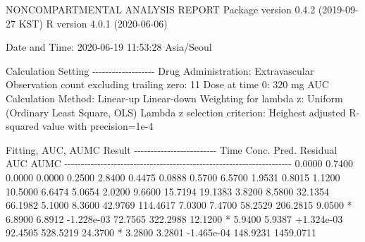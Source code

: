 \documentclass[
  10pt,
]{krantz}
\makeatletter
\newenvironment{Shaded}{\begin{snugshade}}{\end{snugshade}}
\newcommand{\ExtensionTok}[1]{#1}
\newcommand{\NormalTok}[1]{#1}
\newenvironment{kframe}{%
\medskip{}
\setlength{\fboxsep}{.8em}
 \def\at@end@of@kframe{}%
 \ifinner\ifhmode%
  \def\at@end@of@kframe{\end{minipage}}%
  \begin{minipage}{\columnwidth}%
 \fi\fi%
 \def\FrameCommand##1{\hskip\@totalleftmargin \hskip-\fboxsep
 \colorbox{shadecolor}{##1}\hskip-\fboxsep
     \hskip-\linewidth \hskip-\@totalleftmargin \hskip\columnwidth}%
 \MakeFramed {\advance\hsize-\width
   \@totalleftmargin\z@ \linewidth\hsize
   \@setminipage}}%
 {\par\unskip\endMakeFramed%
 \at@end@of@kframe}
\renewenvironment{Shaded}{\begin{kframe}}{\end{kframe}}
\makeatother
\begin{document}
\begin{Shaded}
\begin{Highlighting}[]
                        \ExtensionTok{NONCOMPARTMENTAL}\NormalTok{ ANALYSIS REPORT}
                       \ExtensionTok{Package}\NormalTok{ version 0.4.2 (2019{-}09{-}27 KST)}
                          \ExtensionTok{R}\NormalTok{ version 4.0.1 (2020{-}06{-}06)}

\ExtensionTok{Date}\NormalTok{ and Time: 2020{-}06{-}19 11:53:28 Asia/Seoul}

\ExtensionTok{Calculation}\NormalTok{ Setting}
\ExtensionTok{{-}{-}{-}{-}{-}{-}{-}{-}{-}{-}{-}{-}{-}{-}{-}{-}{-}{-}{-}}
\ExtensionTok{Drug}\NormalTok{ Administration: Extravascular}
\ExtensionTok{Observation}\NormalTok{ count excluding trailing zero: 11}
\ExtensionTok{Dose}\NormalTok{ at time 0: 320 mg}
\ExtensionTok{AUC}\NormalTok{ Calculation Method: Linear{-}up Linear{-}down}
\ExtensionTok{Weighting}\NormalTok{ for lambda z: Uniform (Ordinary Least Square, OLS)}
\ExtensionTok{Lambda}\NormalTok{ z selection criterion: Heighest adjusted R{-}squared value with precision=1e{-}4}


\ExtensionTok{Fitting}\NormalTok{, AUC, AUMC Result}
\ExtensionTok{{-}{-}{-}{-}{-}{-}{-}{-}{-}{-}{-}{-}{-}{-}{-}{-}{-}{-}{-}{-}{-}{-}{-}{-}{-}}
      \ExtensionTok{Time}\NormalTok{         Conc.      Pred.   Residual       AUC       AUMC}
\ExtensionTok{{-}{-}{-}{-}{-}{-}{-}{-}{-}{-}{-}{-}{-}{-}{-}{-}{-}{-}{-}{-}{-}{-}{-}{-}{-}{-}{-}{-}{-}{-}{-}{-}{-}{-}{-}{-}{-}{-}{-}{-}{-}{-}{-}{-}{-}{-}{-}{-}{-}{-}{-}{-}{-}{-}{-}{-}{-}{-}{-}{-}{-}{-}{-}{-}{-}{-}{-}{-}{-}}
     \ExtensionTok{0.0000}\NormalTok{       0.7400                           0.0000     0.0000}
     \ExtensionTok{0.2500}\NormalTok{       2.8400                           0.4475     0.0888}
     \ExtensionTok{0.5700}\NormalTok{       6.5700                           1.9531     0.8015}
     \ExtensionTok{1.1200}\NormalTok{      10.5000                           6.6474     5.0654}
     \ExtensionTok{2.0200}\NormalTok{       9.6600                          15.7194    19.1383}
     \ExtensionTok{3.8200}\NormalTok{       8.5800                          32.1354    66.1982}
     \ExtensionTok{5.1000}\NormalTok{       8.3600                          42.9769   114.4617}
     \ExtensionTok{7.0300}\NormalTok{       7.4700                          58.2529   206.2815}
     \ExtensionTok{9.0500}\NormalTok{ *     6.8900     6.8912 {-}1.228e{-}03    72.7565   322.2988}
    \ExtensionTok{12.1200}\NormalTok{ *     5.9400     5.9387 +1.324e{-}03    92.4505   528.5219}
    \ExtensionTok{24.3700}\NormalTok{ *     3.2800     3.2801 {-}1.465e{-}04   148.9231  1459.0711}


\end{Highlighting}
\end{Shaded}
\end{document}
